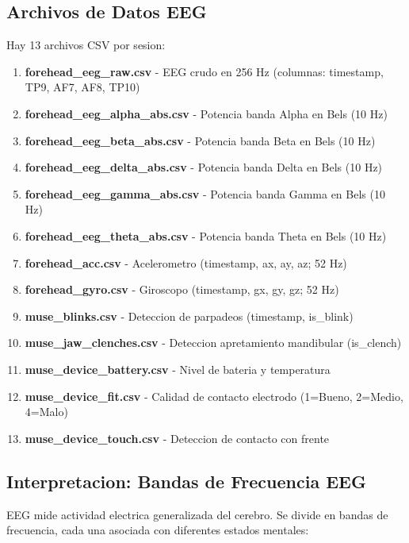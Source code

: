 \subsection{Archivos de Datos EEG}

Hay 13 archivos CSV por sesion:

\begin{enumerate}
    \item \textbf{forehead\_eeg\_raw.csv} - EEG crudo en 256 Hz (columnas: timestamp, TP9, AF7, AF8, TP10)
    \item \textbf{forehead\_eeg\_alpha\_abs.csv} - Potencia banda Alpha en Bels (10 Hz)
    \item \textbf{forehead\_eeg\_beta\_abs.csv} - Potencia banda Beta en Bels (10 Hz)
    \item \textbf{forehead\_eeg\_delta\_abs.csv} - Potencia banda Delta en Bels (10 Hz)
    \item \textbf{forehead\_eeg\_gamma\_abs.csv} - Potencia banda Gamma en Bels (10 Hz)
    \item \textbf{forehead\_eeg\_theta\_abs.csv} - Potencia banda Theta en Bels (10 Hz)
    \item \textbf{forehead\_acc.csv} - Acelerometro (timestamp, ax, ay, az; 52 Hz)
    \item \textbf{forehead\_gyro.csv} - Giroscopo (timestamp, gx, gy, gz; 52 Hz)
    \item \textbf{muse\_blinks.csv} - Deteccion de parpadeos (timestamp, is\_blink)
    \item \textbf{muse\_jaw\_clenches.csv} - Deteccion apretamiento mandibular (is\_clench)
    \item \textbf{muse\_device\_battery.csv} - Nivel de bateria y temperatura
    \item \textbf{muse\_device\_fit.csv} - Calidad de contacto electrodo (1=Bueno, 2=Medio, 4=Malo)
    \item \textbf{muse\_device\_touch.csv} - Deteccion de contacto con frente
\end{enumerate}

\subsection{Interpretacion: Bandas de Frecuencia EEG}

EEG mide actividad electrica generalizada del cerebro. Se divide en bandas de
frecuencia, cada una asociada con diferentes estados mentales:

